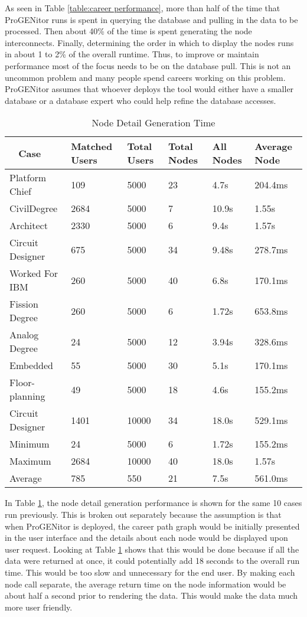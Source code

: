 As seen in Table \ref{table:career performance}, more than half of the time that
ProGENitor runs is spent in querying the database and pulling in the data to be
processed.  Then about 40\% of the time is spent generating the node
interconnects. Finally, determining the order in which to display the nodes runs
in about 1 to 2\% of the overall runtime.  Thus, to improve or maintain performance most of
the focus needs to be on the database pull.  This is not an uncommon problem and
many people spend careers working on this problem.  ProGENitor assumes that
whoever deploys the tool would either have a smaller database or a database
expert who could help refine the database accesses.

\begin{table}[H]
  \centering
  \begin{tabular}{|p{17mm}|p{16mm}|p{10mm}|p{18mm}|p{19mm}|p{20mm}|}
  \hline
  \
  Case&Matched Users&Total Users&Total Nodes&All Nodes&Average Node\\
  \hline\hline
  Platform Chief&109&5000&23&4.7s&204.4ms\\ \hline
  Civil\newline Degree&2684&5000&7&10.9s&1.55s\\ \hline 
  Architect&2330&5000&6&9.4s&1.57s\\ \hline
  Circuit Designer&675&5000&34&9.48s&278.7ms\\ \hline
  Worked For IBM&260&5000&40&6.8s&170.1ms\\ \hline
  Fission Degree&260&5000&6&1.72s&653.8ms\\ \hline
  Analog Degree&24&5000&12&3.94s&328.6ms\\ \hline
  Embedded&55&5000&30&5.1s&170.1ms\\ \hline
  Floor- \newline planning&49&5000&18&4.6s&155.2ms\\ \hline
  Circuit Designer&1401&10000&34&18.0s&529.1ms\\ \hline
  \hline\hline
  Minimum&24&5000&6&1.72s&155.2ms\\ \hline
  Maximum&2684&10000&40&18.0s&1.57s\\ \hline
  Average&785&550&21&7.5s&561.0ms\\ \hline
  \end{tabular}
  \caption{Node Detail Generation Time}
  \label{table:node-perf}
\end{table}

In Table \ref{table:node-perf}, the node detail generation performance is shown
for the same 10 cases run previously.  This is broken out separately because the
assumption is that when ProGENitor is deployed, the career path graph would be
initially presented in the user interface and the details about each node would be
displayed upon user request.  Looking at Table \ref{table:node-perf} shows that
this would be done because if all the data were returned at once, it could
potentially add 18 seconds to the overall run time.  This would be too slow and
unnecessary for the end user.  By making each node call separate, the average
return time on the node information would be about half a second prior to
rendering the data.  This would make the data much more user friendly.